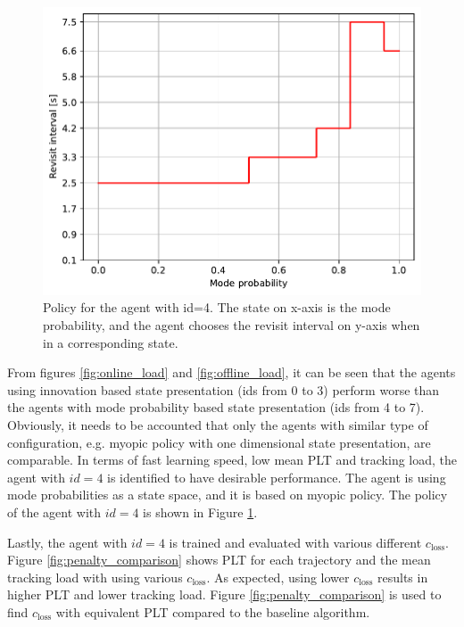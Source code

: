 \documentclass[english, 12pt, a4paper, elec, utf8, a-1b, online]{aaltothesis}
\newcommand{\closs}{c_\text{loss}}
\begin{document}
\begin{figure}[b]
    \centering
    \includegraphics[width=.7\linewidth]{figures/benchmark/Simulations/policy.pdf}
    \caption{Policy for the agent with id=4. The state on x-axis is the mode probability, and the agent chooses the revisit interval on y-axis when in a corresponding state.}
    \label{fig:policy_id4}
\end{figure}

From figures \ref{fig:online_load} and \ref{fig:offline_load}, it can be seen that the agents using innovation based state presentation (ids from 0 to 3) perform worse than the agents with mode probability based state presentation (ids from 4 to 7).
Obviously, it needs to be accounted that only the agents with similar type of configuration, e.g. myopic policy with one dimensional state presentation, are comparable.
In terms of fast learning speed, low mean PLT and tracking load, the agent with $id=4$ is identified to have desirable performance.
The agent is using mode probabilities as a state space, and it is based on myopic policy.
The policy of the agent with $id=4$ is shown in Figure \ref{fig:policy_id4}.

Lastly, the agent with $id=4$ is trained and evaluated with various different $\closs$.
Figure \ref{fig:penalty_comparison} shows PLT for each trajectory and the mean tracking load with using various $\closs$.
As expected, using lower $\closs$ results in higher PLT and lower tracking load.
Figure \ref{fig:penalty_comparison} is used to find $\closs$ with equivalent PLT compared to the baseline algorithm. 
\end{document}
